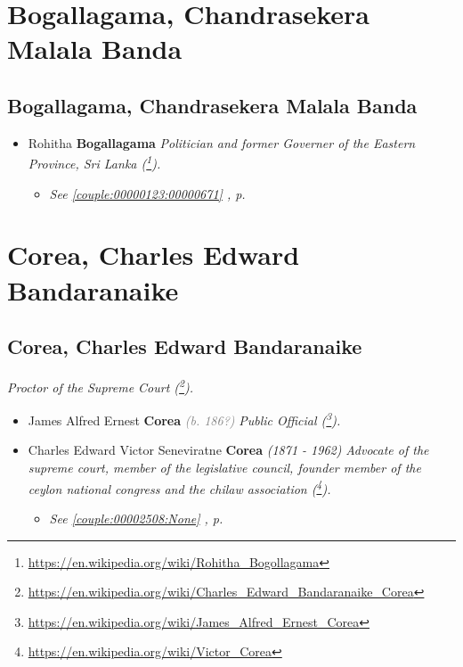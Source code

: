 \documentclass[10pt, openany]{book}
\begin{document}
\part{Bogallagama, Chandrasekera Malala Banda}
\chapter{Bogallagama, Chandrasekera Malala Banda}
\label{00002504}
\textcolor{slmaroon}{\textit{}}
\begin{itemize}
\item{Rohitha \textbf{Bogallagama} \textcolor{slorange}{\textit{}} \textcolor{slmaroon}{\textit{Politician and former Governer of the Eastern Province, Sri Lanka (\footnote{\url{https://en.wikipedia.org/wiki/Rohitha_Bogollagama}}).}}
\begin{itemize}
\item{\textcolor{slteal}{\textit{See  \autoref{couple:00000123:00000671} \textit{, p. \pageref{couple:00000123:00000671} }}}}
\end{itemize}
 }
\end{itemize}
   
\part{Corea, Charles Edward Bandaranaike}
\chapter{Corea, Charles Edward Bandaranaike}
\label{00002515}
\textcolor{slmaroon}{\textit{Proctor of the Supreme Court (\footnote{\url{https://en.wikipedia.org/wiki/Charles_Edward_Bandaranaike_Corea}}).}}
\begin{itemize}
\item{James Alfred Ernest \textbf{Corea} \textcolor{gray}{\textit{(b. 186?)}} \textcolor{slmaroon}{\textit{Public Official (\footnote{\url{https://en.wikipedia.org/wiki/James_Alfred_Ernest_Corea}}).}}
   }
\item{Charles Edward Victor Seneviratne \textbf{Corea} \textcolor{slorange}{\textit{(1871 - 1962)}} \textcolor{slmaroon}{\textit{Advocate of the supreme court, member of the legislative council, founder member of the ceylon national congress and the chilaw association (\footnote{\url{https://en.wikipedia.org/wiki/Victor_Corea}}).}}
\begin{itemize}
\item{\textcolor{slteal}{\textit{See  \autoref{couple:00002508:None} \textit{, p. \pageref{couple:00002508:None} }}}}
\end{itemize}
    }
\end{itemize}
   
\end{document}
